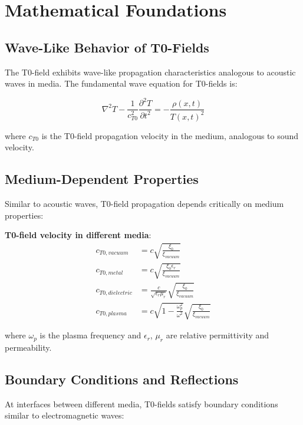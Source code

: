 \documentclass[12pt,a4paper]{article}
\begin{document}
	\section{Mathematical Foundations}
	
	\subsection{Wave-Like Behavior of T0-Fields}
	
	The T0-field exhibits wave-like propagation characteristics analogous to acoustic waves in media. The fundamental wave equation for T0-fields is:
	
	\begin{equation}
		\nabla^2 T - \frac{1}{c_{T0}^2} \frac{\partial^2 T}{\partial t^2} = -\frac{\rho(x,t)}{T(x,t)^2} \label{eq:wave_equation}
	\end{equation}
	
	where $c_{T0}$ is the T0-field propagation velocity in the medium, analogous to sound velocity.
	
	\subsection{Medium-Dependent Properties}
	
	Similar to acoustic waves, T0-field propagation depends critically on medium properties:
	
	\textbf{T0-field velocity in different media}:
	\begin{align}
		c_{T0,vacuum} &= c \sqrt{\frac{\xi_0}{\xi_{vacuum}}} \\
		c_{T0,metal} &= c \sqrt{\frac{\xi_0 \epsilon_r}{\xi_{vacuum}}} \\
		c_{T0,dielectric} &= \frac{c}{\sqrt{\epsilon_r \mu_r}} \sqrt{\frac{\xi_0}{\xi_{vacuum}}} \\
		c_{T0,plasma} &= c \sqrt{1 - \frac{\omega_p^2}{\omega^2}} \sqrt{\frac{\xi_0}{\xi_{vacuum}}}
	\end{align}
	
	where $\omega_p$ is the plasma frequency and $\epsilon_r$, $\mu_r$ are relative permittivity and permeability.
	
	\subsection{Boundary Conditions and Reflections}
	
	At interfaces between different media, T0-fields satisfy boundary conditions similar to electromagnetic waves:
	
\end{document}
